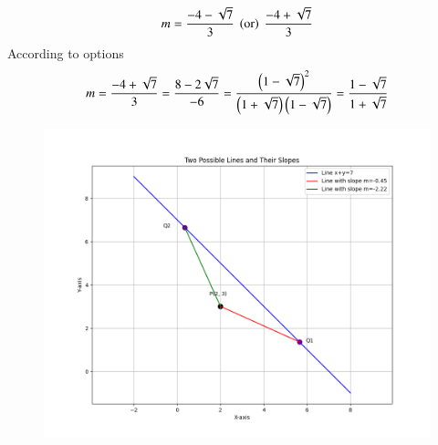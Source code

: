 \documentclass[journal]{IEEEtran}
\begin{document}
\begin{align}  
m=\frac{-4-\sqrt{7}}{3}\ \left(\text{or}\right)\ \frac{-4+\sqrt{7}}{3}
\end{align}
According to options
\begin{align}
m=\frac{-4+\sqrt{7}}{3}=\frac{8-2\sqrt{7}}{-6}=\frac{\left(1-\sqrt{7}\right)^2}{\left(1+\sqrt{7}\right)\left(1-\sqrt{7}\right)}=\frac{1-\sqrt{7}}{1+\sqrt{7}}
\end{align}
\begin{figure}[h!]
   \centering
   \includegraphics[width=0.7\columnwidth]{figs/fig1.png}
   \caption{}
   \label{Figure}
\end{figure}
\end{document}
